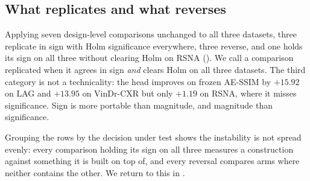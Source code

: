 \documentclass[pmlr,twocolumn,10pt]{jmlr} %
\begin{document}
\subsection{What replicates and what reverses}
Applying seven design-level comparisons unchanged to all three datasets, three replicate in
sign with Holm significance everywhere, three reverse, and one holds its sign on all three
without clearing Holm on RSNA (). We call a comparison replicated when it agrees in sign
\emph{and} clears Holm on all three datasets. The third category is not a technicality: the
head improves on frozen AE-SSIM by $+15.92$ on LAG and $+13.95$ on VinDr-CXR but only
$+1.19$ on RSNA, where it misses significance. Sign is more portable than magnitude, and
magnitude than significance.

Grouping the rows by the decision under test shows the instability is not spread evenly:
every comparison holding its sign on all three measures a construction against something it
is built on top of, and every reversal compares arms where neither contains the other. We
return to this in .
\end{document}
